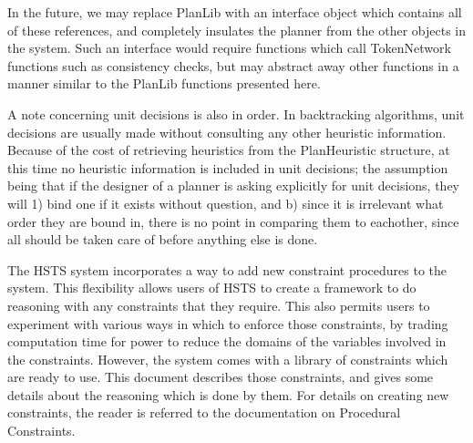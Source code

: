 In the future, we may replace PlanLib with an interface object which contains
all of these references, and completely insulates the planner from the other
objects in the system.  Such an interface would require functions which call
TokenNetwork functions such as consistency checks, but may abstract away other
functions in a manner similar to the PlanLib functions presented here.

A note concerning unit decisions is also in order.  In backtracking algorithms,
unit decisions are usually made without consulting any other heuristic information.
Because of the cost of retrieving heuristics from the PlanHeuristic structure,
at this time no heuristic information is included in unit decisions; the assumption
being that if the designer of a planner is asking explicitly for unit decisions,
they will 1) bind one if it exists without question, and b) since it is irrelevant
what order they are bound in, there is no point in comparing them to eachother,
since all should be taken care of before anything else is done.  








The HSTS system incorporates a way to add new constraint procedures to the system.
This flexibility allows users of HSTS to create a framework to do reasoning with
any constraints that they require.  This also permits users to experiment with various
ways in which to enforce those constraints, by trading computation time for power
to reduce the domains of the variables involved in the constraints.  However, the
system comes with a library of constraints which are ready to use.  This document
describes those constraints, and gives some details about the reasoning which is
done by them.  For details on creating new constraints, the reader is referred to
the documentation on Procedural Constraints.

